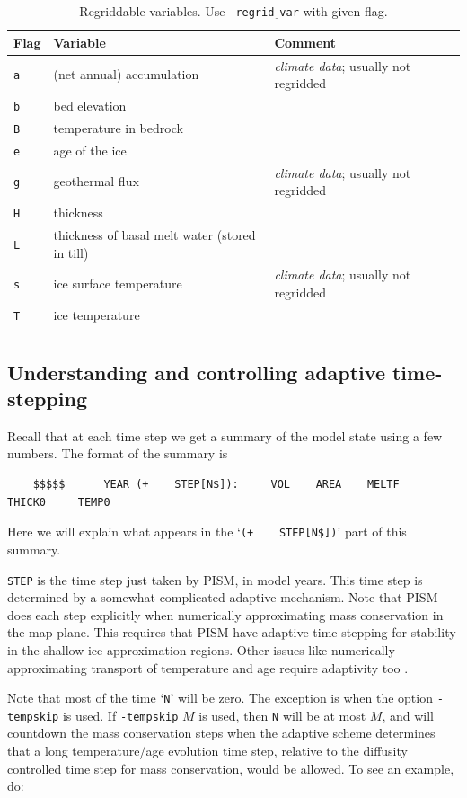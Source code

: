 \documentclass[11pt,final]{amsart}
\begin{document}
\begin{table}[h]
\caption{Regriddable variables.  Use \texttt{-regrid$\underline{\phantom{b}}$var} with given flag.}\label{tab:regridvar}
\begin{tabular}{@{}llll}\hline
\textbf{Flag} & \textbf{Variable} & \textbf{Comment}\\ \hline
\verb|a| & (net annual) accumulation & \emph{climate data}; usually not regridded \\
\verb|b| & bed elevation & \\
\verb|B| & temperature in bedrock & \\
\verb|e| & age of the ice & \\
\verb|g| & geothermal flux & \emph{climate data}; usually not regridded \\
\verb|H| & thickness & \\
\verb|L| & thickness of basal melt water (stored in till) & \\
\verb|s| & ice surface temperature & \emph{climate data}; usually not regridded\\
\verb|T| & ice temperature & \\
\hline
\normalsize
\end{tabular}
\end{table}


\subsection{Understanding and controlling adaptive time-stepping} \label{subsect:adapt} Recall that at each time step we get a summary of the model state using a few numbers.  The format of the summary is
\begin{verbatim}
    $$$$$      YEAR (+    STEP[N$]):     VOL    AREA    MELTF     THICK0     TEMP0
\end{verbatim}
Here we will explain what appears in the `\verb|(+    STEP[N$])|' part of this summary.

\verb|STEP| is the time step just taken by PISM, in model years.  This time step is determined by a somewhat complicated adaptive mechanism.  Note that PISM does each step explicitly when numerically approximating mass conservation in the map-plane.  This requires that PISM have adaptive time-stepping for stability in the shallow ice approximation regions.  Other issues like numerically approximating transport of temperature and age require adaptivity too \cite{BBL}.

Note that most of the time `\verb|N|' will be zero.  The exception is when the option \verb|-tempskip| is used.  If \verb|-tempskip| $M$ is used, then \verb|N| will be at most $M$, and will countdown the mass conservation steps when the adaptive scheme determines that a long temperature/age evolution time step, relative to the diffusity controlled time step for mass conservation, would be allowed.  To see an example, do: 
\end{document}
